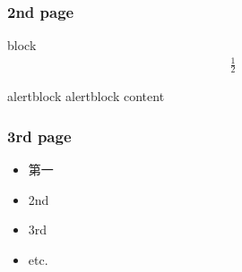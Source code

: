 \documentclass{beamer}
\begin{document}
\section{}
\begin{frame}
\frametitle{2nd page}
\begin{block}{block}
\begin{eqnarray}
\frac{1}{2}
\end{eqnarray}
\end{block}
\begin{alertblock}{alertblock}
alertblock content
\end{alertblock}
\end{frame}
\begin{frame}
\frametitle{3rd page}
\begin{itemize}
\item<1-> 第一
\item<1-> 2nd
\item<2-> 3rd
\item<3-> etc.
\hyperlink{1stpage}{}
\end{itemize}
\end{frame}
\end{document}
